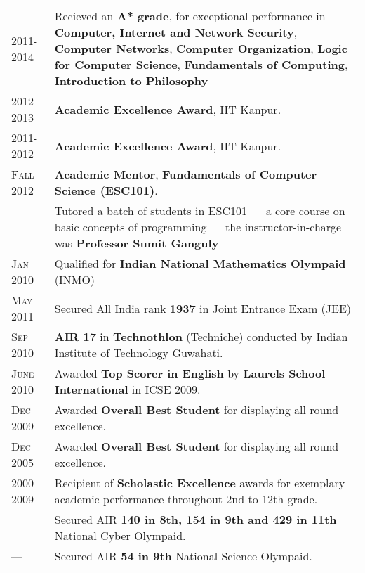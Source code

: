 \documentclass[a4paper,10pt]{article} %
\newcommand{\itemlist}[1]{
    \begin{tabular}{>{\raggedleft}p{2.2cm}p{17cm}}
        #1
    \end{tabular}
}
\begin{document}
\itemlist {
    \textsc{2011-2014}   & Recieved an \textbf{A* grade}, for exceptional performance in
                            \textbf{Computer, Internet and Network Security},
                            \textbf{Computer Networks},
                            \textbf{Computer Organization},
                            \textbf{Logic for Computer Science},
                            \textbf{Fundamentals of Computing},
                            \textbf{Introduction to Philosophy} \\
    \textsc{2012-2013}   & \textbf{Academic Excellence Award}, IIT Kanpur. \\
    \textsc{2011-2012}   & \textbf{Academic Excellence Award}, IIT Kanpur. \\
    \textsc{Fall 2012}   & \textbf{Academic Mentor}, \textbf{Fundamentals of Computer Science (ESC101)}. \\
                         & \footnotesize{Tutored a batch of students in ESC101 --- a core course on
                            basic concepts of programming --- the instructor-in-charge was \textbf{Professor
                            Sumit Ganguly}}\\
    \textsc{Jan 2010}    & Qualified for \textbf{Indian National Mathematics Olympaid} (INMO) \\
    \textsc{May 2011}    & Secured All India rank \textbf{1937} in Joint Entrance Exam (JEE) \\
    \textsc{Sep 2010}    & \textbf{AIR 17} in \textbf{Technothlon} (Techniche) conducted by Indian Institute of Technology Guwahati. \\
    \textsc{June 2010}   & Awarded \textbf{Top Scorer in English} by \textbf{Laurels School International} in ICSE 2009. \\
    \textsc{Dec 2009}    & Awarded \textbf{Overall Best Student} for displaying all round excellence. \\
    \textsc{Dec 2005}    & Awarded \textbf{Overall Best Student} for displaying all round excellence. \\
    \textsc{2000 -- 2009} & Recipient of \textbf{Scholastic Excellence} awards for exemplary academic
                           performance throughout 2nd to 12th grade. \\
    \textsc{---} & Secured AIR \textbf{140 in 8th, 154 in 9th and 429 in 11th} National Cyber Olympaid.\\
    \textsc{---} & Secured AIR \textbf{54 in 9th} National Science Olympaid.\\
}
\end{document}
